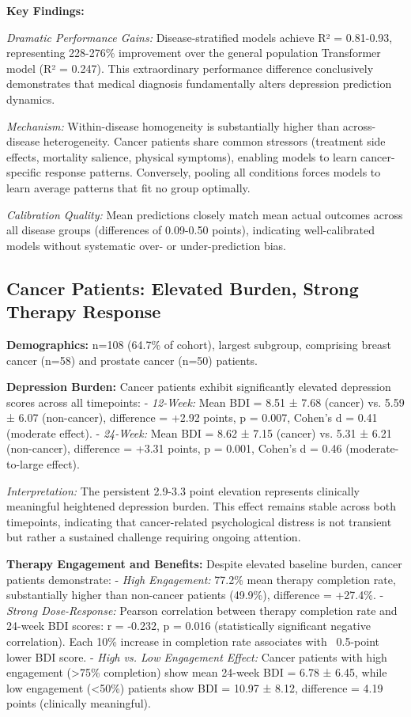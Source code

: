 \documentclass[conference]{IEEEtran}
\begin{document}
\textbf{Key Findings:}

\textit{Dramatic Performance Gains:} Disease-stratified models achieve R² = 0.81-0.93, representing 228-276\% improvement over the general population Transformer model (R² = 0.247). This extraordinary performance difference conclusively demonstrates that medical diagnosis fundamentally alters depression prediction dynamics.

\textit{Mechanism:} Within-disease homogeneity is substantially higher than across-disease heterogeneity. Cancer patients share common stressors (treatment side effects, mortality salience, physical symptoms), enabling models to learn cancer-specific response patterns. Conversely, pooling all conditions forces models to learn average patterns that fit no group optimally.

\textit{Calibration Quality:} Mean predictions closely match mean actual outcomes across all disease groups (differences of 0.09-0.50 points), indicating well-calibrated models without systematic over- or under-prediction bias.

\subsection{Cancer Patients: Elevated Burden, Strong Therapy Response}

\textbf{Demographics:} n=108 (64.7\% of cohort), largest subgroup, comprising breast cancer (n=58) and prostate cancer (n=50) patients.

\textbf{Depression Burden:} Cancer patients exhibit significantly elevated depression scores across all timepoints:
- \textit{12-Week:} Mean BDI = 8.51 ± 7.68 (cancer) vs. 5.59 ± 6.07 (non-cancer), difference = +2.92 points, p = 0.007, Cohen's d = 0.41 (moderate effect).
- \textit{24-Week:} Mean BDI = 8.62 ± 7.15 (cancer) vs. 5.31 ± 6.21 (non-cancer), difference = +3.31 points, p = 0.001, Cohen's d = 0.46 (moderate-to-large effect).

\textit{Interpretation:} The persistent 2.9-3.3 point elevation represents clinically meaningful heightened depression burden. This effect remains stable across both timepoints, indicating that cancer-related psychological distress is not transient but rather a sustained challenge requiring ongoing attention.

\textbf{Therapy Engagement and Benefits:} Despite elevated baseline burden, cancer patients demonstrate:
- \textit{High Engagement:} 77.2\% mean therapy completion rate, substantially higher than non-cancer patients (49.9\%), difference = +27.4\%.
- \textit{Strong Dose-Response:} Pearson correlation between therapy completion rate and 24-week BDI scores: r = -0.232, p = 0.016 (statistically significant negative correlation). Each 10\% increase in completion rate associates with ~0.5-point lower BDI score.
- \textit{High vs. Low Engagement Effect:} Cancer patients with high engagement (>75\% completion) show mean 24-week BDI = 6.78 ± 6.45, while low engagement (<50\%) patients show BDI = 10.97 ± 8.12, difference = 4.19 points (clinically meaningful).
\end{document}
